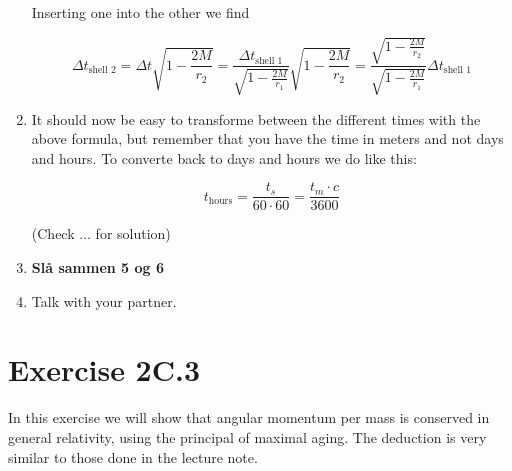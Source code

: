 \documentclass[a4paper,10pt,english]{article}
\begin{document}
\begin{enumerate}
Inserting one into the other we find

\begin{equation*}
\Delta t_{\text{shell 2}}=\Delta t\sqrt{1-\frac{2M}{r_{2}}}=\frac{\Delta t_{\text{shell 1}}}{\sqrt{1-\frac{2M}{r_{1}}}}\sqrt{1-\frac{2M}{r_{2}}}=\frac{\sqrt{1-\frac{2M}{r_{2}}}}{\sqrt{1-\frac{2M}{r_{1}}}}\Delta t_{\text{shell 1}}
\end{equation*}

\item It should now be easy to transforme between the different times with the above formula, but remember that you have the time in meters and not days and hours. To converte back to days and hours we do like this:

\begin{equation*}
t_{\text{hours}}=\frac{t_{s}}{60\cdot60}=\frac{t_{m}\cdot c}{3600}
\end{equation*}

(Check $\ldots$ for solution)

\item \textbf{Slå sammen 5 og 6}

\item Talk with your partner.
  
\end{enumerate}








\section*{Exercise 2C.3}

In this exercise we will show that angular momentum per mass is conserved in general relativity, using the principal of maximal aging. The deduction is very similar to those done in the lecture note.
\end{document}
